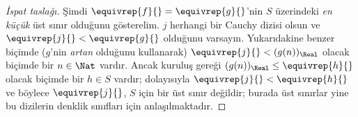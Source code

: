 \documentclass[../../../include/open-logic-section]{subfiles}
\begin{document}
\begin{proof}[İspat taslağı]
Şimdi $\equivrep{f}{} = \equivrep{g}{}$'nin $S$ üzerindeki \emph{en küçük}
üst sınır olduğunu gösterelim. $j$ herhangi bir Cauchy dizisi olsun ve
$\equivrep{j}{} < \equivrep{g}{}$ olduğunu varsayın. Yukarıdakine benzer
biçimde ($g$'nin \emph{artan} olduğunu kullanarak)
$\equivrep{j}{} < (g(n))_\Real$ olacak biçimde bir $n \in \Nat$ vardır.
Ancak kuruluş gereği $(g(n))_\Real \leq \equivrep{h}{}$ olacak biçimde bir
$h \in S$ vardır; dolayısıyla
$\equivrep{j}{} < \equivrep{h}{}$ ve böylece $\equivrep{j}{}$, $S$ için bir
üst sınır değildir; burada üst sınırlar yine bu dizilerin denklik sınıfları için
anlaşılmaktadır.
\end{proof}
\end{document}
